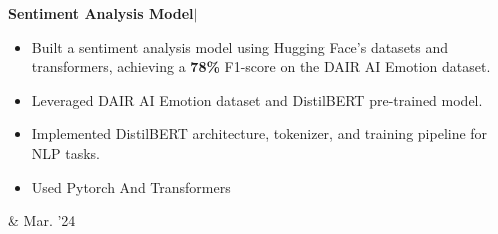 \documentclass[10pt, letterpaper]{article}
\newenvironment{highlights}{
        \begin{itemize}[
                topsep=0pt,
                parsep=0.10 cm,
                partopsep=0pt,
                itemsep=0pt,
                after=\vspace{-1\baselineskip},
                leftmargin=0.4 cm + 3pt
            ]
    }{
        \end{itemize}
    } %
\let\hrefWithoutArrow\href
\renewcommand{\href}[2]{\hrefWithoutArrow{#1}{\mbox{\ifthenelse{\equal{#2}{}}{ }{#2 }\raisebox{.15ex}{\footnotesize \faExternalLink*}}}}
\let\originalTabularx\tabularx
\let\originalEndTabularx\endtabularx
\renewenvironment{tabularx}{\bgroup\centering\originalTabularx}{\originalEndTabularx\par\egroup}
\begin{document}
        \begin{tabularx}{
            \textwidth-0.4 cm-0.13cm
        }{
            K{0.2 cm}
            R{4.1 cm}
        }
            \textbf 
            {Sentiment Analysis Model}$|$ \href{https://github.com/09hritik/sentiment-analysis}{\raisebox{-0.2\height}\faGithub\ }

            \vspace{0.10 cm}

            \begin{highlights}
                   
            \item 
                Built a sentiment analysis model using Hugging Face's datasets and transformers, achieving a \textbf{78\%} F1-score on the DAIR AI Emotion dataset.


            \item 
                Leveraged DAIR AI Emotion dataset and DistilBERT pre-trained model.

            \item  
                Implemented DistilBERT architecture, tokenizer, and training pipeline for NLP tasks.
            \item 
                Used  Pytorch And Transformers
               
            \end{highlights}
            &
            Mar.  '24

        \end{tabularx}



    




\end{document}
